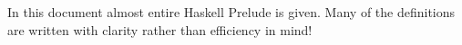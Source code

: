 \documentclass{programmingnotes}
\begin{document}
\renewcommand{\footrulewidth}{0.4pt}
\fancyfoot[LF]{}

\begin{multicols*}{3}



In this document almost entire Haskell Prelude is given.
Many of the definitions are written with clarity rather than efficiency in mind!
\end{multicols*}
\end{document}
